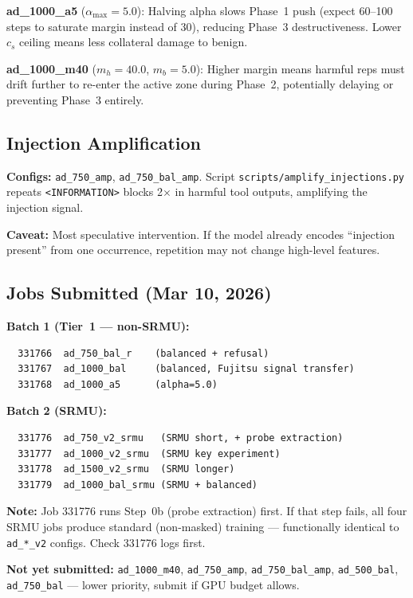 \documentclass[11pt]{article}
\begin{document}
\textbf{ad\_1000\_a5} ($\alpha_{\max}=5.0$): Halving alpha slows Phase~1 push
(expect 60--100 steps to saturate margin instead of 30), reducing Phase~3
destructiveness.  Lower $c_s$ ceiling means less collateral damage to benign.

\textbf{ad\_1000\_m40} ($m_h=40.0$, $m_b=5.0$): Higher margin means harmful
reps must drift further to re-enter the active zone during Phase~2, potentially
delaying or preventing Phase~3 entirely.

\subsection{Injection Amplification}

\textbf{Configs:} \texttt{ad\_750\_amp}, \texttt{ad\_750\_bal\_amp}.
Script \texttt{scripts/amplify\_injections.py} repeats
\texttt{<INFORMATION>} blocks 2$\times$ in harmful tool outputs, amplifying
the injection signal.

\textbf{Caveat:} Most speculative intervention.  If the model already encodes
``injection present'' from one occurrence, repetition may not change
high-level features.

\subsection{Jobs Submitted (Mar 10, 2026)}

\textbf{Batch 1 (Tier~1 --- non-SRMU):}
\begin{verbatim}
  331766  ad_750_bal_r    (balanced + refusal)
  331767  ad_1000_bal     (balanced, Fujitsu signal transfer)
  331768  ad_1000_a5      (alpha=5.0)
\end{verbatim}

\textbf{Batch 2 (SRMU):}
\begin{verbatim}
  331776  ad_750_v2_srmu   (SRMU short, + probe extraction)
  331777  ad_1000_v2_srmu  (SRMU key experiment)
  331778  ad_1500_v2_srmu  (SRMU longer)
  331779  ad_1000_bal_srmu (SRMU + balanced)
\end{verbatim}

\textbf{Note:} Job 331776 runs Step~0b (probe extraction) first.  If that
step fails, all four SRMU jobs produce standard (non-masked) training ---
functionally identical to \texttt{ad\_*\_v2} configs.  Check 331776 logs
first.

\textbf{Not yet submitted:} \texttt{ad\_1000\_m40}, \texttt{ad\_750\_amp},
\texttt{ad\_750\_bal\_amp}, \texttt{ad\_500\_bal}, \texttt{ad\_750\_bal} ---
lower priority, submit if GPU budget allows.
\end{document}
